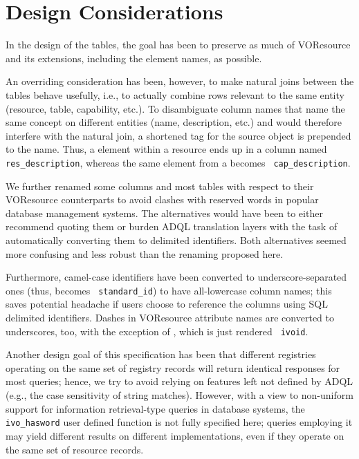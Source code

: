 \documentclass[11pt,a4paper]{ivoa}
\newcommand{\rtent}[1]{\texttt{\color{rtcolor} #1}}
\begin{document}
\section{Design Considerations}

\label{design}

In the design of the tables, the goal has been to preserve as much of
VOResource and its extensions, including the element names, as
possible.

An overriding consideration has been, however, to make natural joins
between the tables behave usefully, i.e., to actually combine rows
relevant to the same entity (resource, table, capability, etc.).
To disambiguate column names that name the same concept on different
entities (name, description, etc.) and would therefore interfere with
the natural join, a shortened tag for the source object
is prepended to the name.  Thus, a  element within
a resource ends up in a column named
\rtent{res\_description}, whereas the same element from a
 becomes \rtent{cap\_description}.

We further renamed some columns and most tables 
with respect to their VOResource
counterparts to avoid clashes with reserved words in popular database
management systems.  The alternatives would have been to either recommend
quoting them or burden ADQL translation layers with the task of
automatically converting them to delimited identifiers.  Both
alternatives seemed more confusing and less robust than the renaming
proposed here.

Furthermore, camel-case identifiers have been converted to
underscore-separated ones (thus,   becomes
\rtent{standard\_id}) to have all-lowercase column names; this saves
potential headache if users choose to reference the columns using SQL
delimited identifiers.  Dashes in VOResource attribute names are
converted to underscores, too, with the exception of
, which is just rendered \rtent{ivoid}.

Another design goal of this specification has been that different registries
operating on the same set of registry records will return identical responses
for most queries; hence, we try to avoid relying on features left not
defined by ADQL (e.g., the case sensitivity of string matches).  However,
with a view to non-uniform support for information retrieval-type
queries in database systems, the \rtent{ivo\_hasword} user defined
function is not fully specified here; queries employing it may yield
different results on different implementations, even if they operate on
the same set of resource records.
\end{document}
